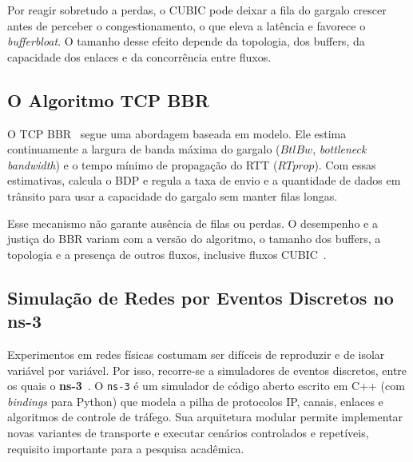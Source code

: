 \documentclass[a4paper,12pt]{monografia}
\begin{document}
Por reagir sobretudo a perdas, o CUBIC pode deixar a fila do gargalo crescer antes de perceber o congestionamento, o que eleva a latência e favorece o \textit{bufferbloat}. O tamanho desse efeito depende da topologia, dos buffers, da capacidade dos enlaces e da concorrência entre fluxos.

\subsection{O Algoritmo TCP BBR}
O TCP BBR~\cite{cardwell2017} segue uma abordagem baseada em modelo. Ele estima continuamente a largura de banda máxima do gargalo ($BtlBw$, \textit{bottleneck bandwidth}) e o tempo mínimo de propagação do RTT ($RTprop$). Com essas estimativas, calcula o BDP e regula a taxa de envio e a quantidade de dados em trânsito para usar a capacidade do gargalo sem manter filas longas.

Esse mecanismo não garante ausência de filas ou perdas. O desempenho e a justiça do BBR variam com a versão do algoritmo, o tamanho dos buffers, a topologia e a presença de outros fluxos, inclusive fluxos CUBIC~\cite{ware2019,casas2022}.

\subsection{Simulação de Redes por Eventos Discretos no ns-3}
Experimentos em redes físicas costumam ser difíceis de reproduzir e de isolar variável por variável. Por isso, recorre-se a simuladores de eventos discretos, entre os quais o \textbf{ns-3}~\cite{ns3}. O \texttt{ns-3} é um simulador de código aberto escrito em C++ (com \textit{bindings} para Python) que modela a pilha de protocolos IP, canais, enlaces e algoritmos de controle de tráfego. Sua arquitetura modular permite implementar novas variantes de transporte e executar cenários controlados e repetíveis, requisito importante para a pesquisa acadêmica.
\end{document}
